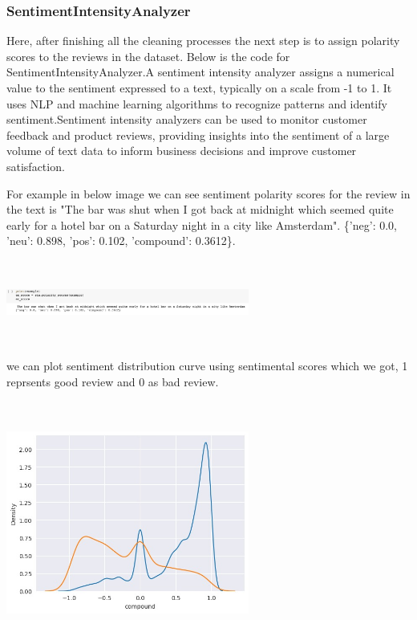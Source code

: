 \subsubsection{SentimentIntensityAnalyzer}

Here, after finishing all the cleaning processes the next step is to assign polarity scores to the reviews in the dataset. Below is the code for SentimentIntensityAnalyzer.A sentiment intensity analyzer assigns a numerical value to the sentiment expressed to a text, typically on a scale from -1 to 1. It uses NLP and machine learning algorithms to recognize patterns and identify sentiment.Sentiment intensity analyzers can be used to monitor customer feedback and product reviews, providing insights into the sentiment of a large volume of text data to inform business decisions and improve customer satisfaction.

For example in below image we can see sentiment polarity scores for the review in the text is "The bar was shut when I got back at midnight which seemed quite early for a hotel bar on a Saturday night in a city like Amsterdam". \{'neg': 0.0, 'neu': 0.898, 'pos': 0.102, 'compound': 0.3612\}.

\includegraphics[width=8cm, height=2.75cm ]{siapol.jpeg}

we can plot sentiment distribution curve using sentimental scores which we got, 1 reprsents good review and 0 as bad review.

\includegraphics[width=8cm, height=8cm ]{density.jpeg}

